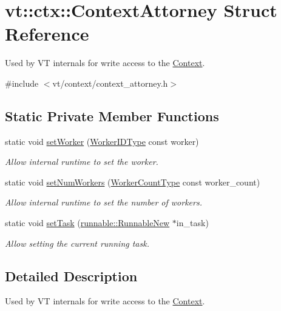 \hypertarget{structvt_1_1ctx_1_1_context_attorney}{}\section{vt\+:\+:ctx\+:\+:Context\+Attorney Struct Reference}
\label{structvt_1_1ctx_1_1_context_attorney}


Used by VT internals for write access to the \hyperlink{structvt_1_1ctx_1_1_context}{Context}.  




{\ttfamily \#include $<$vt/context/context\+\_\+attorney.\+h$>$}

\subsection*{Static Private Member Functions}
\begin{DoxyCompactItemize}
\item 
static void \hyperlink{structvt_1_1ctx_1_1_context_attorney_aff61a50ec309e8a225504d2f27aa48d4}{set\+Worker} (\hyperlink{namespacevt_a656e362091da17b9b93d0655b36e3392}{Worker\+I\+D\+Type} const worker)
\begin{DoxyCompactList}\small\item\em Allow internal runtime to set the worker. \end{DoxyCompactList}\item 
static void \hyperlink{structvt_1_1ctx_1_1_context_attorney_ab853e0d8039812dfb6b1158f30b39a2a}{set\+Num\+Workers} (\hyperlink{namespacevt_aa93398ea48f2cb6c188512250f7cc248}{Worker\+Count\+Type} const worker\+\_\+count)
\begin{DoxyCompactList}\small\item\em Allow internal runtime to set the number of workers. \end{DoxyCompactList}\item 
static void \hyperlink{structvt_1_1ctx_1_1_context_attorney_aa9e72be8e7f7ccc50cc235b1177d8add}{set\+Task} (\hyperlink{structvt_1_1runnable_1_1_runnable_new}{runnable\+::\+Runnable\+New} $\ast$in\+\_\+task)
\begin{DoxyCompactList}\small\item\em Allow setting the current running task. \end{DoxyCompactList}\end{DoxyCompactItemize}


\subsection{Detailed Description}
Used by VT internals for write access to the \hyperlink{structvt_1_1ctx_1_1_context}{Context}. 

